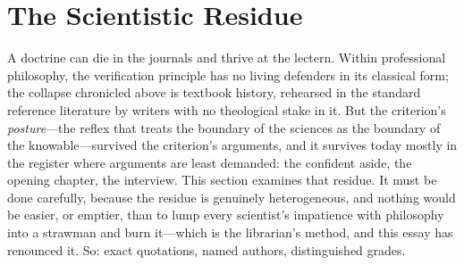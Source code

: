 \section{The Scientistic Residue}

A doctrine can die in the journals and thrive at the lectern. Within professional philosophy, the verification principle has no living defenders in its classical form; the collapse chronicled above is textbook history, rehearsed in the standard reference literature by writers with no theological stake in it. But the criterion's \emph{posture}---the reflex that treats the boundary of the sciences as the boundary of the knowable---survived the criterion's arguments, and it survives today mostly in the register where arguments are least demanded: the confident aside, the opening chapter, the interview. This section examines that residue. It must be done carefully, because the residue is genuinely heterogeneous, and nothing would be easier, or emptier, than to lump every scientist's impatience with philosophy into a strawman and burn it---which is the librarian's method, and this essay has renounced it. So: exact quotations, named authors, distinguished grades.

